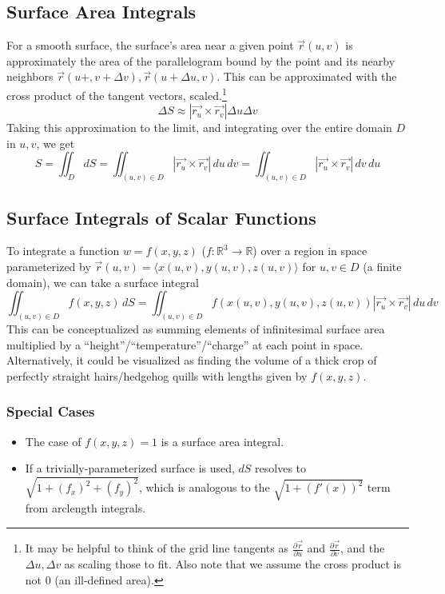 \documentclass{article}
\newcommand{\vect}[1]{\ensuremath{\overrightarrow{#1}}}
\begin{document}
\subsection{Surface Area Integrals}
For a smooth surface, the surface's area near a given point $\vect{r}(u,v)$ is approximately the area of the parallelogram bound by the point and its nearby neighbors $\vect{r}(u+,v+\Delta v), \vect{r}(u+\Delta u, v)$. This can be approximated with the cross product of the tangent vectors, scaled.\footnote{It may be helpful to think of the grid line tangents as $\frac{\partial \vect{r}}{\partial u}$ and $\frac{\partial \vect{r}}{\partial v}$, and the $\Delta u,\Delta v$ as scaling those to fit. Also note that we assume the cross product is not $0$ (an ill-defined area).}
$$\Delta S \approx \left|\vect{r_u}\times\vect{r_v}\right|\Delta u\Delta v$$
Taking this approximation to the limit, and integrating over the entire domain $D$ in $u,v$, we get
$$S = \iint_DdS=\iint_{(u,v)\in D}\left|\vect{r_u}\times\vect{r_v}\right|\,du\,dv=\iint_{(u,v)\in D}\left|\vect{r_u}\times\vect{r_v}\right|\,dv\,du$$

\subsection{Surface Integrals of Scalar Functions}
To integrate a function $w=f(x,y,z)$ ($f:\mathbb{R}^3\to\mathbb{R}$) over a region in space parameterized by $\vect{r}(u,v)=\langle x(u,v), y(u,v), z(u,v) \rangle$ for $u,v \in D$ (a finite domain), we can take a surface integral
$$\iint_{(u,v)\in D} f(x,y,z)\,dS=\iint_{(u,v)\in D}f(x(u,v),y(u,v),z(u,v))\left|\vect{r_u}\times\vect{r_v}\right|\,du\,dv$$
This can be conceptualized as summing elements of infinitesimal surface area multiplied by a ``height''/``temperature''/``charge'' at each point in space. Alternatively, it could be visualized as finding the volume of a thick crop of perfectly straight hairs/hedgehog quills with lengths given by $f(x,y,z)$.

\subsubsection{Special Cases}
\begin{itemize}
    \item The case of $f(x,y,z)=1$ is a surface area integral.
    \item If a trivially-parameterized surface is used, $dS$ resolves to $\sqrt{1+\left(f_x\right)^2+\left(f_y\right)^2}$, which is analogous to the $\sqrt{1+(f'(x))^2}$ term from arclength integrals.
\end{itemize}
\end{document}

